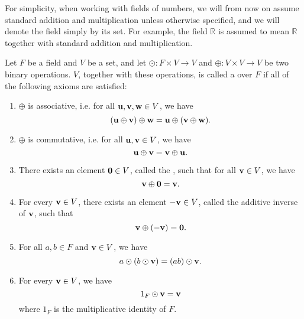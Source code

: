 For simplicity, when working with fields of numbers, we will from now on assume standard addition and multiplication unless otherwise specified, and we will denote the field simply by its set. For example, the field $ \mathbb{R} $ is assumed to mean $ \mathbb{R} $ together with standard addition and multiplication.

\begin{defn}
Let $ F $ be a field and $ V $ be a set, and let $ \odot:F\times V\to V $ and $ \oplus:V\times V\to V $ be two binary operations. $ V $, together with these operations, is called a  over $ F $ if all of the following axioms are satisfied:
\begin{enumerate}
    \item $ \oplus $ is associative, i.e. for all $ \boldsymbol{\mathbf{u}},\boldsymbol{\mathbf{v}},\boldsymbol{\mathbf{w}}\in V $, we have
    \begin{equation*}
        (\boldsymbol{\mathbf{u}}\oplus\boldsymbol{\mathbf{v}})\oplus\boldsymbol{\mathbf{w}}=\boldsymbol{\mathbf{u}}\oplus(\boldsymbol{\mathbf{v}}\oplus\boldsymbol{\mathbf{w}}).
    \end{equation*}

    \item $ \oplus $ is commutative, i.e. for all $ \boldsymbol{\mathbf{u}},\boldsymbol{\mathbf{v}}\in V $, we have
    \begin{equation*}
        \boldsymbol{\mathbf{u}}\oplus\boldsymbol{\mathbf{v}}=\boldsymbol{\mathbf{v}}\oplus\boldsymbol{\mathbf{u}}.
    \end{equation*}

    \item There exists an element $ \boldsymbol{\mathbf{0}}\in V $, called the , such that for all $ \boldsymbol{\mathbf{v}}\in V $, we have
    \begin{equation*}
        \boldsymbol{\mathbf{v}}\oplus\boldsymbol{\mathbf{0}}=\boldsymbol{\mathbf{v}}.
    \end{equation*}

    \item For every $ \boldsymbol{\mathbf{v}}\in V $, there exists an element $ -\boldsymbol{\mathbf{v}}\in V $\!, called the additive inverse of $ \boldsymbol{\mathbf{v}} $, such that
    \begin{equation*}
        \boldsymbol{\mathbf{v}}\oplus(-\boldsymbol{\mathbf{v}})=\boldsymbol{\mathbf{0}}.
    \end{equation*}

    \item\label{axiom:vect5} For all $ a,b\in F $ and $ \boldsymbol{\mathbf{v}}\in V $, we have
    \begin{equation*}
        a\odot (b\odot\boldsymbol{\mathbf{v}})=(ab)\odot\boldsymbol{\mathbf{v}}.
    \end{equation*}

    \item For every $ \boldsymbol{\mathbf{v}}\in V $, we have
    \begin{equation*}
        1_F\odot\boldsymbol{\mathbf{v}}=\boldsymbol{\mathbf{v}}
    \end{equation*}
    where $ 1_F $ is the multiplicative identity of $ F $.


\end{enumerate}
\end{defn}
